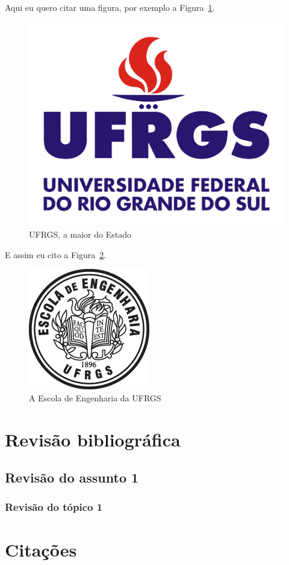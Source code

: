 \documentclass{automatex}
\begin{document}
Aqui eu quero citar uma figura, por exemplo a Figura~\ref{fig:ufrgs}.

\begin{figure}
  \centering
  \includegraphics[width=.4\textwidth]{imagens/logo_ufrgs}
  \caption{UFRGS, a maior do Estado}
  \label{fig:ufrgs}
\end{figure}

\lipsum[13]

E assim eu cito a Figura~\ref{fig:ee}.

\begin{figure}
  \centering
  \includegraphics[width=.3\textwidth]{imagens/logo_eng}
  \caption{A Escola de Engenharia da UFRGS}
  \label{fig:ee}
\end{figure}


\section{Revisão bibliográfica}

\lipsum[10]

\subsection{Revisão do assunto 1}

\lipsum[11]

\subsubsection{Revisão do tópico 1}

\lipsum[12]

\section{Citações}
\end{document}
